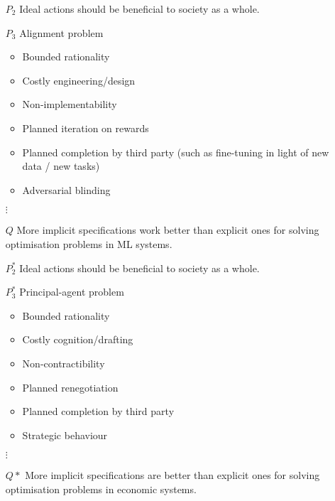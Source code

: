\documentclass{amsart}
\theoremstyle{indented}
\theoremstyle{indentedProp}
\theoremstyle{indented}
\theoremstyle{indented}
\theoremstyle{indented}
\theoremstyle{indented}
\theoremstyle{indented}
\begin{document}
\begin{table}[htb!]
    \begin{multicols}{2}
    \begin{enumerate}
        \item[$P_{2}$] Ideal actions should be beneficial to society as a whole.
        \item[]
        \item[$P_{3}$] Alignment problem
        \begin{itemize}
            \item Bounded rationality
            \item Costly engineering/design
            \item Non-implementability
            \item Planned iteration on rewards
            \item Planned completion by third party (such as fine-tuning in light of new data / new tasks)
            \item Adversarial blinding
        \end{itemize}
        \item[]
        \item[] $\vdots$
        \item[]
        \item[$Q$] More implicit specifications work better than explicit ones for solving optimisation problems in ML systems.
    \end{enumerate}

    \columnbreak

    \begin{enumerate}
        \item[$P^{*}_{2}$] Ideal actions should be beneficial to society as a whole.
            \item[]
            \item[$P^{*}_{3}$] Principal-agent problem
            \begin{itemize}
                \item Bounded rationality
                \item Costly cognition/drafting
                \item Non-contractibility
                \item Planned renegotiation
                \item Planned completion by third party
                \item[]
                \item Strategic behaviour
            \end{itemize}
            \item[]
            \item[] $\vdots$
            \item[]
            \item[$Q*$] More implicit specifications are better than explicit ones for solving optimisation problems in economic systems.
        \end{enumerate}


\end{multicols}
\end{table}
\end{document}

